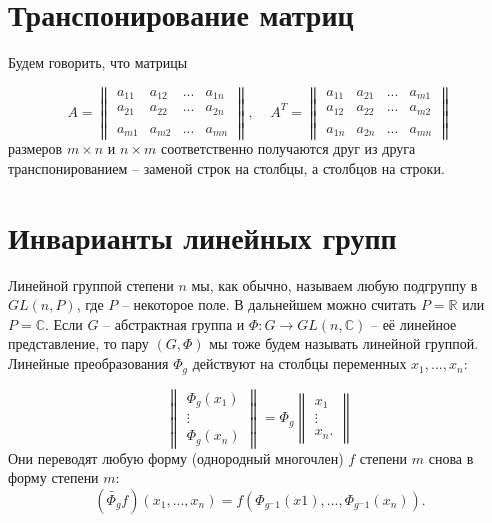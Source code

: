 \documentclass[a4paper, 12pt]{article} %
\begin{document}
\clearpage
\section*{Транспонирование матриц}
Будем говорить, что матрицы

\begin{equation}
    A =
    \begin{Vmatrix}
        a_{11} & a_{12} & ... & a_{1n} \\
        a_{21} & a_{22} & ... & a_{2n} \\
        \\
        a_{m1} & a_{m2} & ... & a_{mn}
    \end{Vmatrix},
    ~~~~~
    A^T =
    \begin{Vmatrix}
        a_{11} & a_{21} & ... & a_{m1} \\
        a_{12} & a_{22} & ... & a_{m2} \\
        \\
        a_{1n} & a_{2n} & ... & a_{mn}
    \end{Vmatrix}
\end{equation}
размеров $m \times n$ и $n \times m$ соответственно получаются друг из друга транспонированием -- заменой строк на столбцы, а столбцов на строки.

\clearpage
\section*{Инварианты линейных групп}
Линейной группой степени $n$ мы, как обычно, называем любую подгруппу в $GL(n, P)$, где $P$ -- некоторое поле. В дальнейшем можно считать $P = \mathbb{R}$ или $P = \mathbb{C}$. Если $G$ -- абстрактная группа и $\Phi : G \to GL(n, \mathbb{C})$ -- её линейное представление, то пару $(G, \Phi)$ мы тоже будем называть линейной группой. Линейные преобразования $\Phi_g$ действуют на столбцы переменных $x_1,...,x_n$:

\begin{equation}
    \begin{Vmatrix}
        \Phi_g(x_1) \\
        \vdots      \\
        \Phi_g(x_n)
    \end{Vmatrix}
    = \Phi_g
    \begin{Vmatrix}
        x_1    \\
        \vdots \\
        x_n.
    \end{Vmatrix}
\end{equation}
Они переводят любую форму (однородный многочлен) $f$ степени $m$ снова в форму степени $m$:
\begin{equation}
    (\widetilde{\Phi_g}f)(x_1, ..., x_n) = f(\Phi_{g^-1}(x1), ..., \Phi_{g^-1}(x_n)).
\end{equation}
\end{document}
